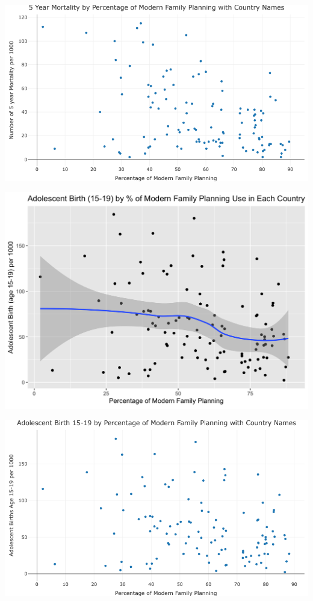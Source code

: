 \documentclass[
  letterpaper,
  DIV=11,
  numbers=noendperiod]{scrartcl}
\begin{document}
\includegraphics{newplot (3).png}

\includegraphics{adolescent 1519.png}

\includegraphics{newplot (4).png}
\end{document}
